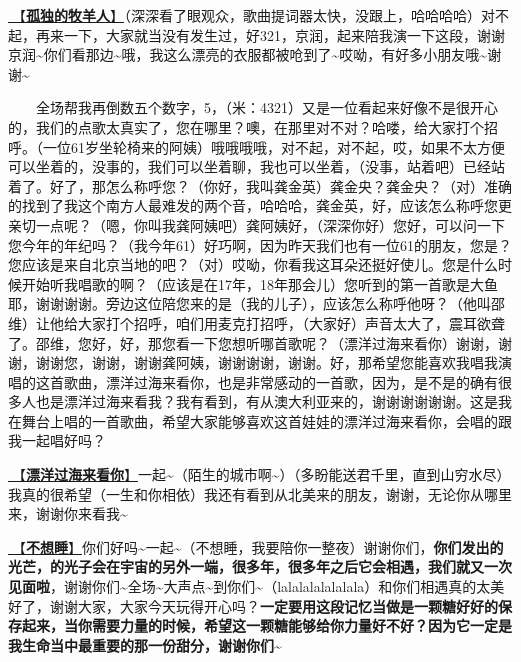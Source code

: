 \documentclass[]{ctexbook}
\begin{document}
\hyperref[lonely-shepherd]{🎵【\textbf{孤独的牧羊人}】}（深深看了眼观众，歌曲提词器太快，没跟上，哈哈哈哈）对不起，再来一下，大家就当没有发生过，好321，京润，起来陪我演一下这段，谢谢京润\textasciitilde 你们看那边\textasciitilde 哦，我这么漂亮的衣服都被呛到了\textasciitilde 哎呦，有好多小朋友哦\textasciitilde 谢谢\textasciitilde{}

  全场帮我再倒数五个数字，5，（米：4321）又是一位看起来好像不是很开心的，我们的点歌太真实了，您在哪里？噢，在那里对不对？哈喽，给大家打个招呼。（一位61岁坐轮椅来的阿姨）哦哦哦哦，对不起，对不起，哎，如果不太方便可以坐着的，没事的，我们可以坐着聊，我也可以坐着，（没事，站着吧）已经站着了。好了，那怎么称呼您？（你好，我叫龚金英）龚金央？龚金央？（对）准确的找到了我这个南方人最难发的两个音，哈哈哈，龚金英，好，应该怎么称呼您更亲切一点呢？（嗯，你叫我龚阿姨吧）龚阿姨好，（深深你好）您好，可以问一下您今年的年纪吗？（我今年61）好巧啊，因为昨天我们也有一位61的朋友，您是？您应该是来自北京当地的吧？（对）哎呦，你看我这耳朵还挺好使儿。您是什么时候开始听我唱歌的啊？（应该是在17年，18年那会儿）您听到的第一首歌是大鱼耶，谢谢谢谢。旁边这位陪您来的是（我的儿子），应该怎么称呼他呀？（他叫邵维）让他给大家打个招呼，咱们用麦克打招呼，（大家好）声音太大了，震耳欲聋了。邵维，您好，好，那您看一下您想听哪首歌呢？（漂洋过海来看你）谢谢，谢谢，谢谢您，谢谢，谢谢龚阿姨，谢谢谢谢，谢谢。好，那希望您能喜欢我唱我演唱的这首歌曲，漂洋过海来看你，也是非常感动的一首歌，因为，是不是的确有很多人也是漂洋过海来看我？我有看到，有从澳大利亚来的，谢谢谢谢谢谢。这是我在舞台上唱的一首歌曲，希望大家能够喜欢这首娃娃的漂洋过海来看你，会唱的跟我一起唱好吗？

\hyperref[across-the-ocean-to-see-you]{🎵【\textbf{漂洋过海来看你}】}一起\textasciitilde（陌生的城市啊\textasciitilde）（多盼能送君千里，直到山穷水尽）我真的很希望（一生和你相依）我还有看到从北美来的朋友，谢谢，无论你从哪里来，谢谢你来看我\textasciitilde{}

\hyperref[donot-want-to-sleep]{🎵【\textbf{不想睡}】}你们好吗\textasciitilde 一起\textasciitilde（不想睡，我要陪你一整夜）谢谢你们，\textbf{你们发出的光芒，的光子会在宇宙的另外一端，很多年，很多年之后它会相遇，我们就又一次见面啦}，谢谢你们\textasciitilde 全场\textasciitilde 大声点\textasciitilde 到你们\textasciitilde（lalalalalalalala）和你们相遇真的太美好了，谢谢大家，大家今天玩得开心吗？\textbf{一定要用这段记忆当做是一颗糖好好的保存起来，当你需要力量的时候，希望这一颗糖能够给你力量好不好？因为它一定是我生命当中最重要的那一份甜分，谢谢你们\textasciitilde{}}
\end{document}
